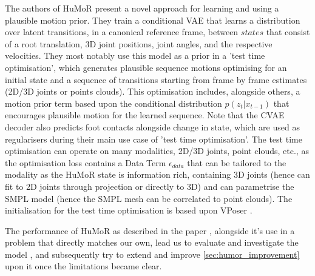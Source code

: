 The authors of HuMoR \cite{humor} present a novel approach for learning and using a plausible motion prior. They train a conditional VAE that learns a distribution over latent transitions, in a canonical reference frame, between $\textit{states}$ that consist of a root translation, 3D joint positions, joint angles, and the respective velocities. They most notably use this model as a prior in a 'test time optimisation', which generates plausible sequence motions optimising for an initial state and a sequence of transitions starting from frame by frame estimates (2D/3D joints or points clouds). This optimisation includes, alongside others, a motion prior term based upon the conditional distribution $p(z_t|x_{t-1})$ that encourages plausible motion for the learned sequence. Note that the CVAE decoder also predicts foot contacts alongside change in state, which are used as regularisers during their main use case of 'test time optimisation'. The test time optimisation can operate on many modalities, 2D/3D joints, point clouds, etc., as the optimisation loss contains a Data Term $\epsilon_{data}$ that can be tailored to the modality as the HuMoR state is information rich, containing 3D joints (hence can fit to 2D joints through projection or directly to 3D) and can parametrise the SMPL model (hence the SMPL mesh can be correlated to point clouds). The initialisation for the test time optimisation is based upon VPoser . 

The performance of HuMoR as described in the paper \cite{humor}, alongside it's use in a problem that directly matches our own, lead us to evaluate and investigate the model , and subsequently try to extend and improve \ref{sec:humor_improvement} upon it once the limitations became clear.

